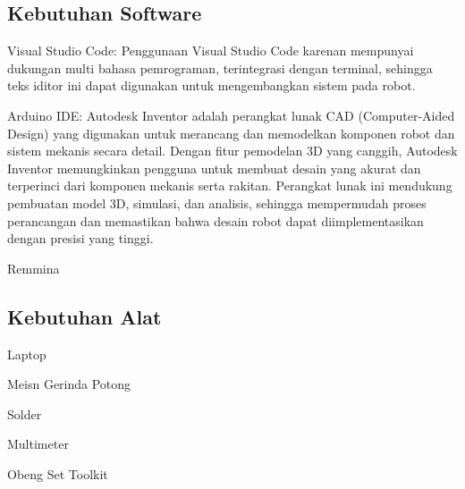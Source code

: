 \subsection{Kebutuhan Software}
\begin{packed_item}
	\item Visual Studio Code: Penggunaan  Visual Studio Code karenan mempunyai dukungan multi bahasa pemrograman, terintegrasi dengan terminal, sehingga teks iditor ini dapat digunakan untuk mengembangkan sistem pada robot. 
	\item Arduino IDE: Autodesk Inventor adalah perangkat lunak CAD (Computer-Aided Design) yang digunakan untuk merancang dan memodelkan komponen robot dan sistem mekanis secara detail. Dengan fitur pemodelan 3D yang canggih, Autodesk Inventor memungkinkan pengguna untuk membuat desain yang akurat dan terperinci dari komponen mekanis serta rakitan. Perangkat lunak ini mendukung pembuatan model 3D, simulasi, dan analisis, sehingga mempermudah proses perancangan dan memastikan bahwa desain robot dapat diimplementasikan dengan presisi yang tinggi.
	\item Remmina
\end{packed_item}

\subsection{Kebutuhan Alat}
\begin{packed_item}
	\item Laptop
	\item Meisn Gerinda Potong  
	\item Solder
	\item Multimeter
	\item Obeng Set Toolkit
\end{packed_item}

